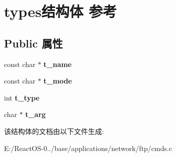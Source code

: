 \hypertarget{structtypes}{}\section{types结构体 参考}
\label{structtypes}
\subsection*{Public 属性}
\begin{DoxyCompactItemize}
\item 
\mbox{\label{structtypes_a4058c1ff6d149e40af5b4aae68a0625a}} 
const char $\ast$ {\bfseries t\+\_\+name}
\item 
\mbox{\label{structtypes_a862d866069623b9cf710f7a5a7af773a}} 
const char $\ast$ {\bfseries t\+\_\+mode}
\item 
\mbox{\label{structtypes_a421d1f164227cc9cecc4b0f8e217aaae}} 
int {\bfseries t\+\_\+type}
\item 
\mbox{\label{structtypes_afdc215c7655ee131748378044220a4d2}} 
char $\ast$ {\bfseries t\+\_\+arg}
\end{DoxyCompactItemize}


该结构体的文档由以下文件生成\+:\begin{DoxyCompactItemize}
\item 
E\+:/\+React\+O\+S-\/0../base/applications/network/ftp/cmds.\+c\end{DoxyCompactItemize}
